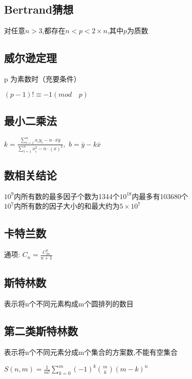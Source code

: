 \documentclass[twocolumn,a4]{article}
\begin{document}
\subsection{Bertrand猜想}
对任意$n>3$,都存在$n<p<2\times n$,其中$p$为质数\\

\subsection{威尔逊定理}
p 为素数时（充要条件）\\
\begin{LARGE}
    $(p-1)!\equiv -1(mod\quad p)$
\end{LARGE}

\subsection{最小二乘法}
\begin{LARGE}
    $\displaystyle k=\frac{\sum_{i=1}^{n}x_{i}y_{i}-n\cdot\overline{x}\overline{y}}{\sum_{i=1}^{n}x_{i}^{2}-n\cdot (\overline{x})^{2}} ,$
    $b=\overline{y}-k\overline{x}$
\end{LARGE}

\subsection{数相关结论}
$10^{9}$内所有数的最多因子个数为1344个$10^{18}$内最多有103680个\\
$10^{7}$内所有数的因子大小的和最大约为$5\times 10^{7}$\\
\subsection{卡特兰数}
\begin{Large}
    通项: $C_n=\frac{C_{2n}^{n}}{n+1}$
\end{Large}

\subsection{斯特林数}
表示将n个不同元素构成m个圆排列的数目

\subsection{第二类斯特林数}
表示将n个不同元素分成m个集合的方案数,不能有空集合\\
\begin{large}
    $S(n,m)=\frac{1}{m!}\sum_{k=0}^{m}(-1)^{k}\binom{m}{k}(m-k)^{n} $
\end{large}
\end{document}
